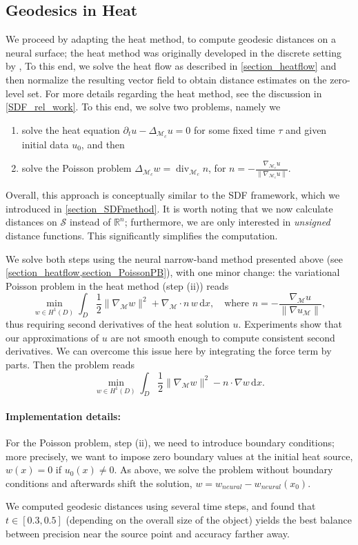 \documentclass[12pt,openany]{book}
\newcommand{\R}{\mathbb{R}}
\def\S{\mathcal{S}}
\theoremstyle{plainnormal}
\theoremstyle{remark}
\begin{document}
\subsection{Geodesics in Heat}
We proceed by adapting the heat method, to compute geodesic distances on a neural surface; the heat method was originally developed in the discrete setting by \cite{Crane_2013}, To this end, we solve the heat flow as described in \cref{section_heatflow} and then normalize the resulting vector field to obtain distance estimates on the zero-level set. For more details regarding the heat method, see the discussion in \cref{SDF_rel_work}. \newpage
To this end, we solve two problems, namely we
\begin{enumerate}
    \item solve the heat equation $\partial_t u - \Delta_{\mathcal{M}_c} u = 0$ for some fixed time $\tau$ and given initial data $u_0$, and then
    \item solve the Poisson problem $\Delta_{\mathcal{M}_c} w = \operatorname{div}_{\mathcal{M}_c}  n$, for $ n = -\frac{\nabla_{\mathcal{M}_c} u}{\|\nabla_{\mathcal{M}_c} u\|}$.
\end{enumerate}
Overall, this approach is conceptually similar to the SDF framework, which we introduced in \cref{section_SDFmethod}. 
It is worth noting that we now calculate distances on $\S$ instead of $\R^n$; furthermore, we are only interested in \emph{unsigned} distance functions. This significantly simplifies the computation.\par
We solve both steps using the neural narrow-band method presented above (see \cref{section_heatflow,section_PoissonPB}), with one minor change: the variational Poisson problem in the heat method (step (ii)) reads
$$\min_{w\in H^1(D)}\int_D \frac{1}{2}\|\nabla_\mathcal{M}w\|^2 + \nabla_{\mathcal{M}} \cdot n \, w \,\mathrm{d}x, \quad \text{where } n = - \frac{\nabla_{\mathcal{M}} u}{\|\nabla u_{\mathcal{M}}\|},$$
thus requiring second derivatives of the heat solution $u$. Experiments show that our approximations of $u$ are not smooth enough to compute consistent second derivatives. We can overcome this issue here by integrating the force term by parts. Then the problem reads 
$$\min_{w\in H^1(D)}\int_D \frac{1}{2}\|\nabla_\mathcal{M}w\|^2 - n\cdot \nabla w \,\mathrm{d}x.$$
\paragraph{Implementation details:}
For the Poisson problem, step (ii), we need to introduce boundary conditions; more precisely, we want to impose zero boundary values at the initial heat source, $w(x) = 0$ if $u_0(x) \neq 0 $. As above, we solve the problem without boundary conditions and afterwards shift the solution, $w = w_{neural} - w_{neural}(x_0).$\par
We computed geodesic distances using several time steps, and found that \( t \in [0.3, 0.5] \) (depending on the overall size of the object) yields the best balance between precision near the source point and accuracy farther away.
\end{document}
